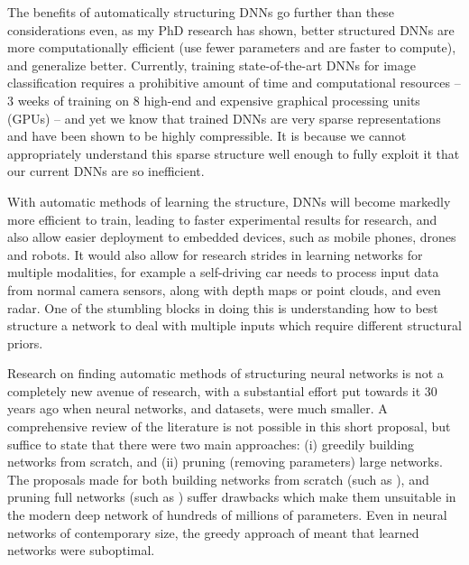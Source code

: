 \documentclass[thesis]{subfiles}
\begin{document}
The benefits of automatically structuring DNNs go further than these considerations even, as my PhD research has shown, better structured DNNs are more computationally efficient (use fewer parameters and are faster to compute), and generalize better. Currently, training state-of-the-art DNNs for image classification requires a prohibitive amount of time and computational resources -- 3 weeks of training on 8 high-end and expensive graphical processing units (GPUs) -- and yet we know that trained DNNs are very sparse representations and have been shown to be highly compressible. It is because we cannot appropriately understand this sparse structure well enough to fully exploit it that our current DNNs are so inefficient.

With automatic methods of learning the structure, DNNs will become markedly more efficient to train, leading to faster experimental results for research, and also allow easier deployment to embedded devices, such as mobile phones, drones and robots. It would also allow for research strides in learning networks for multiple modalities, for example a self-driving car needs to process input data from normal camera sensors, along with depth maps or point clouds, and even radar. One of the stumbling blocks in doing this is understanding how to best structure a network to deal with multiple inputs which require different structural priors.

Research on finding automatic methods of structuring neural networks is not a completely new avenue of research, with a substantial effort put towards it 30 years ago when neural networks, and datasets, were much smaller. A comprehensive review of the literature is not possible in this short proposal, but suffice to state that there were two main approaches: (i) greedily building networks from scratch, and (ii) pruning (removing parameters) large networks. The proposals made for both building networks from scratch (such as \citep{Fahlman1989}), and pruning full networks (such as \citep{lecun1989optimal}) suffer drawbacks which make them unsuitable in the modern deep network of hundreds of millions of parameters. Even in neural networks of contemporary size, the greedy approach of \citet{Fahlman1989} meant that learned networks were suboptimal. %
\end{document}
